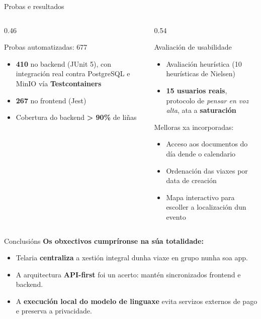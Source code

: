 \documentclass[11pt,aspectratio=169]{beamer}
\begin{document}
\begin{frame}{Probas e resultados}
  \begin{columns}[T]
    \begin{column}{0.46\textwidth}
      \begin{block}{Probas automatizadas: 677}
        \begin{itemize}\small
          \item \textbf{410} no backend (JUnit 5), con integración real contra PostgreSQL e MinIO vía \textbf{Testcontainers}
          \item \textbf{267} no frontend (Jest)
          \item Cobertura do backend \textbf{> 90\%} de liñas
        \end{itemize}
      \end{block}
    \end{column}
    \begin{column}{0.54\textwidth}
      \begin{block}{Avaliación de usabilidade}
        \begin{itemize}\small
          \item Avaliación heurística (10 heurísticas de Nielsen)
          \item \textbf{15 usuarios reais}, protocolo de \textit{pensar en voz alta}, ata a \textbf{saturación}
        \end{itemize}
        \smallskip
        Melloras xa incorporadas:
        \begin{itemize}\small
          \item Acceso aos documentos do día dende o calendario
          \item Ordenación das viaxes por data de creación
          \item Mapa interactivo para escoller a localización dun evento
        \end{itemize}
      \end{block}
    \end{column}
  \end{columns}
\end{frame}

\begin{frame}{Conclusións}
  \textbf{Os obxectivos cumpríronse na súa totalidade:}
  \medskip
  \begin{itemize}
    \item Telaria \textbf{centraliza} a xestión integral dunha viaxe en grupo nunha soa app.
    \item A arquitectura \textbf{API-first} foi un acerto: mantén sincronizados frontend e backend.
    \item A \textbf{execución local do modelo de linguaxe} evita servizos externos de pago e preserva a privacidade.
  \end{itemize}
\end{frame}
\end{document}
